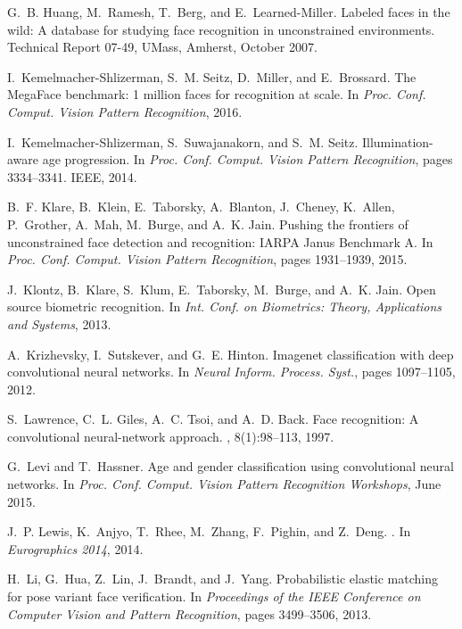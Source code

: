 \documentclass[runningheads]{llncs}
\begin{document}
\begin{thebibliography}{10}
G.~B. Huang, M.~Ramesh, T.~Berg, and E.~Learned-Miller.
\newblock Labeled faces in the wild: A database for studying face recognition
  in unconstrained environments.
\newblock Technical Report 07-49, UMass, Amherst, October 2007.

I.~Kemelmacher-Shlizerman, S.~M. Seitz, D.~Miller, and E.~Brossard.
\newblock The {MegaFace} benchmark: 1 million faces for recognition at scale.
\newblock In {\em Proc. Conf. Comput. Vision Pattern Recognition}, 2016.

I.~Kemelmacher-Shlizerman, S.~Suwajanakorn, and S.~M. Seitz.
\newblock Illumination-aware age progression.
\newblock In {\em Proc. Conf. Comput. Vision Pattern Recognition}, pages
  3334--3341. IEEE, 2014.

B.~F. Klare, B.~Klein, E.~Taborsky, A.~Blanton, J.~Cheney, K.~Allen,
  P.~Grother, A.~Mah, M.~Burge, and A.~K. Jain.
\newblock Pushing the frontiers of unconstrained face detection and
  recognition: {IARPA} {Janus} {Benchmark} {A}.
\newblock In {\em Proc. Conf. Comput. Vision Pattern Recognition}, pages
  1931--1939, 2015.

J.~Klontz, B.~Klare, S.~Klum, E.~Taborsky, M.~Burge, and A.~K. Jain.
\newblock Open source biometric recognition.
\newblock In {\em Int. Conf. on Biometrics: Theory, Applications and Systems},
  2013.

A.~Krizhevsky, I.~Sutskever, and G.~E. Hinton.
\newblock Imagenet classification with deep convolutional neural networks.
\newblock In {\em Neural Inform. Process. Syst.}, pages 1097--1105, 2012.

S.~Lawrence, C.~L. Giles, A.~C. Tsoi, and A.~D. Back.
\newblock Face recognition: A convolutional neural-network approach.
, 8(1):98--113, 1997.

G.~Levi and T.~Hassner.
\newblock Age and gender classification using convolutional neural networks.
\newblock In {\em Proc. Conf. Comput. Vision Pattern Recognition Workshops},
  June 2015.

J.~P. Lewis, K.~Anjyo, T.~Rhee, M.~Zhang, F.~Pighin, and Z.~Deng.
.
\newblock In {\em Eurographics 2014}, 2014.

H.~Li, G.~Hua, Z.~Lin, J.~Brandt, and J.~Yang.
\newblock Probabilistic elastic matching for pose variant face verification.
\newblock In {\em Proceedings of the IEEE Conference on Computer Vision and
  Pattern Recognition}, pages 3499--3506, 2013.


\end{thebibliography}
\end{document}
